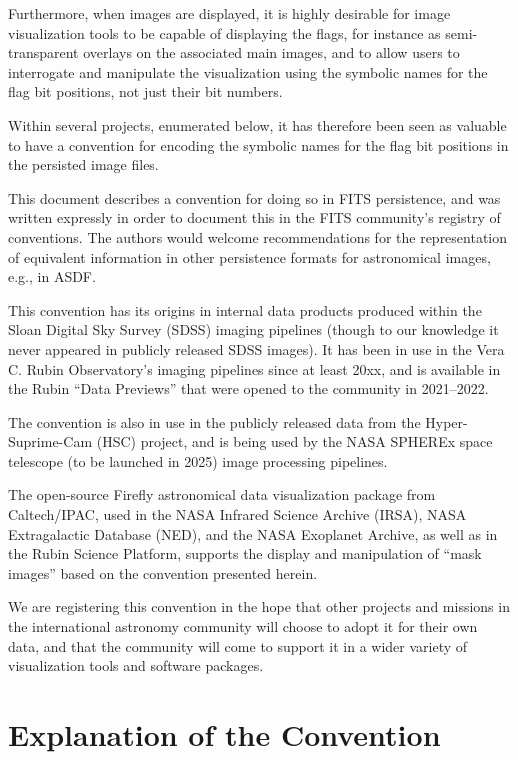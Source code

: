\documentclass[DM,authoryear,toc]{lsstdoc}
\begin{document}
Furthermore, when images are displayed, it is highly desirable for
image visualization tools to be capable of displaying the flags,
for instance as semi-transparent overlays on the associated main
images, and to allow users to interrogate and manipulate the
visualization using the symbolic names for the flag bit positions,
not just their bit numbers.

Within several projects, enumerated below, it has therefore been seen
as valuable to have a convention for encoding the symbolic names for
the flag bit positions in the persisted image files.

This document describes a convention for doing so in FITS persistence,
and was written expressly in order to document this in the FITS
community's registry of conventions.
The authors would welcome recommendations for the representation of
equivalent information in other persistence formats for astronomical
images, e.g., in ASDF.

This convention has its origins in internal data products produced
within the Sloan Digital Sky Survey (SDSS) imaging pipelines (though
to our knowledge it never appeared in publicly released SDSS images).
It has been in use in the Vera C. Rubin Observatory's imaging
pipelines since at least 20xx, and is available in the Rubin ``Data
Previews'' that were opened to the community in 2021--2022.

The convention is also in use in the publicly released data from
the Hyper-Suprime-Cam (HSC) project, and is being used by the NASA
SPHEREx space telescope (to be launched in 2025) image processing
pipelines.

The open-source Firefly astronomical data visualization package
from Caltech/IPAC, used in the NASA Infrared Science Archive (IRSA),
NASA Extragalactic Database (NED), and the NASA Exoplanet Archive,
as well as in the Rubin Science Platform, supports the display and
manipulation of ``mask images'' based on the convention presented
herein.

We are registering this convention in the hope that other projects
and missions in the international astronomy community will choose
to adopt it for their own data, and that the community will come to
support it in a wider variety of visualization tools and software
packages.

\section{Explanation of the Convention}
\end{document}
